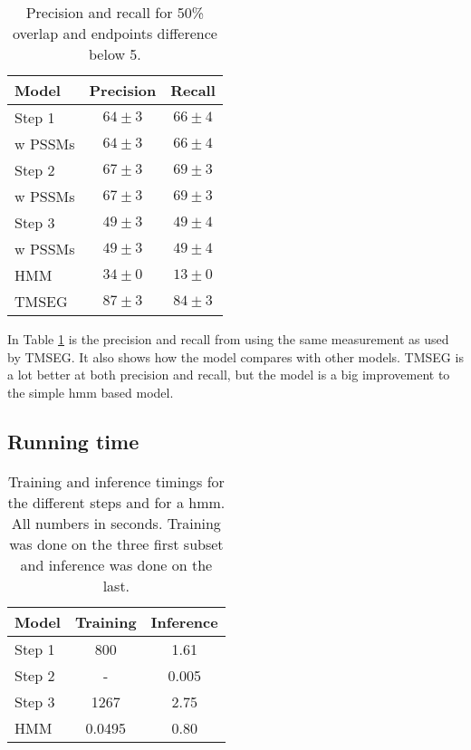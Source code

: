 \begin{table}
	\centering 
	\begin{tabular}{l|c|c} 
		Model & Precision & Recall \\ \hline
		Step 1 & $64 \pm 3$ & $66 \pm 4$ \\ 
		w PSSMs& $64 \pm 3$ & $66 \pm 4$ \\
		Step 2 & $67 \pm 3$ & $69 \pm 3$ \\ 
		w PSSMs& $67 \pm 3$ & $69 \pm 3$ \\
		Step 3 & $49 \pm 3$ & $49 \pm 4$ \\
		w PSSMs& $49 \pm 3$ & $49 \pm 4$ \\
		HMM   & $34 \pm 0$ & $13 \pm 0$ \\ 
		TMSEG\cite{tmseg} & $87 \pm 3$ & $84 \pm 3$
	\end{tabular}
    \caption{Precision and recall for 50\% overlap and endpoints difference below 5.}
	\label{tab:pr50}
\end{table}

In Table \ref{tab:pr50} is the precision and recall from using the same 
measurement as used by TMSEG. It also shows how the model compares with 
other models. TMSEG is a lot better at both precision and recall, 
but the model is a big improvement to the simple \gls{hmm}
based model. 

\subsection{Running time}
\label{sec:time}



\begin{table}
	\centering 
	\begin{tabular}{l|c|c} 
		Model & Training & Inference \\ \hline
		Step 1 & 800 & 1.61 \\ 
		Step 2 & - & 0.005 \\ 
		Step 3 & 1267 & 2.75 \\
		HMM   & 0.0495 & 0.80
	\end{tabular}
	\caption{Training and inference timings for the different steps 
		and for a \gls{hmm}. All numbers in seconds. Training was done
		on the three first subset and inference was done on the last.}
	\label{tab:time}
\end{table}


